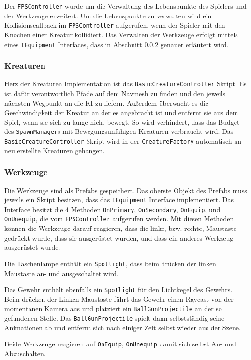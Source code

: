 Der \texttt{FPSController} wurde um die Verwaltung des Lebenspunkte des Spielers und der Werkzeuge erweitert.
Um die Lebenspunkte zu verwalten wird ein Kollisionscallback im \texttt{FPSController} aufgerufen, wenn der Spieler mit den Knochen einer Kreatur kollidiert.
Das Verwalten der Werkzeuge erfolgt mittels eines \texttt{IEquipment} Interfaces, dass in Abschnitt \ref{sec:design-tools} genauer erläutert wird.

\subsubsection{Kreaturen}
Herz der Kreaturen Implementation ist das \texttt{BasicCreatureController} Skript.
Es ist dafür verantwortlich Pfade auf dem Navmesh zu finden und den jeweils nächsten Wegpunkt an die KI zu liefern.
Außerdem überwacht es die Geschwindigkeit der Kreatur an der es angebracht ist und entfernt sie aus dem Spiel, wenn sie sich zu lange nicht bewegt.
So wird verhindert, dass das Budget des \texttt{SpawnManager}s mit Bewegungsunfähigen Kreaturen verbraucht wird.
Das \texttt{BasicCreatureController} Skript wird in der \texttt{CreatureFactory} automatisch an neu erstellte Kreaturen gehangen.

\subsubsection{Werkzeuge}
\label{sec:design-tools}
Die Werkzeuge sind als Prefabs gespeichert.
Das oberste Objekt des Prefabs muss jeweils ein Skript besitzen, dass das \texttt{IEquipment} Interface implementiert.
Das Interface besitzt die 4 Methoden \texttt{OnPrimary}, \texttt{OnSecondary}, \texttt{OnEquip}, und \texttt{OnUnequip}, die vom \texttt{FPSController} aufgerufen werden.
Mit diesen Methoden können die Werkzeuge darauf reagieren, dass die linke, bzw. rechte, Maustaste gedrückt wurde, dass sie ausgerüstet wurden, und dass ein anderes Werkzeug ausgerüstet wurde.

Die Taschenlampe enthält ein \texttt{Spotlight}, dass beim drücken der linken Maustaste an- und ausgeschaltet wird.

Das Gewehr enthält ebenfalls ein \texttt{Spotlight} für den Lichtkegel des Gewehrs.
Beim drücken der Linken Maustaste führt das Gewehr einen Raycast von der momentanen Kamera aus und platziert ein \texttt{BallGunProjectile} an der so gefundenen Stelle.
Das \texttt{BallGunProjectile} spielt dann selbstständig seine Animationen ab und entfernt sich nach einiger Zeit selbst wieder aus der Szene.

Beide Werkzeuge reagieren auf \texttt{OnEquip}, \texttt{OnUnequip} damit sich selbst An- und Abzuschalten.